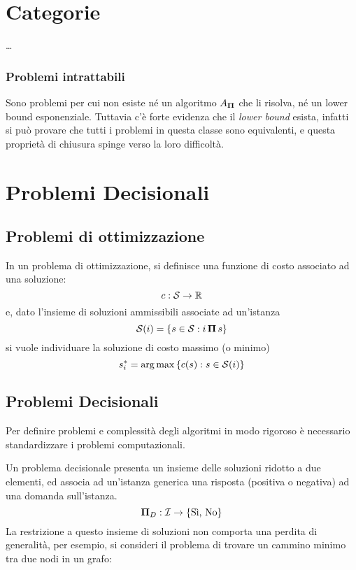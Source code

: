 

\section{Categorie}

\dots

\subsubsection{Problemi intrattabili}

Sono problemi per cui non esiste né un algoritmo $A_{\bm{\Pi}{}}$ che li risolva, né un lower bound esponenziale.
Tuttavia c'è forte evidenza che il \textit{lower bound} esista, infatti si può provare che tutti i problemi in questa classe sono equivalenti, e questa proprietà di chiusura spinge verso la loro difficoltà.

\section{Problemi Decisionali}

\subsection{Problemi di ottimizzazione}

In un problema di ottimizzazione, si definisce una funzione di costo associato ad una soluzione:
\begin{equation*}
    c : \mathcal{S}{} \rightarrow \mathbb{R}
\end{equation*}
e, dato l'insieme di soluzioni ammissibili associate ad un'istanza
\begin{equation*}
    \mathcal{S}{} (i) = \left\{ s \in \mathcal{S}{} : i \, \bm{\Pi}{} \, s \right\}
\end{equation*}
si vuole individuare la soluzione di costo massimo (o minimo)
\begin{equation*}
    s_{i}^{*} = \operatorname*{arg\,max} \left\{ c(s) : s \in \mathcal{S}{} (i) \right\}
\end{equation*}

\subsection{Problemi Decisionali}

Per definire problemi e complessità degli algoritmi in modo rigoroso è necessario standardizzare i problemi computazionali.

Un problema decisionale presenta un insieme delle soluzioni ridotto a due elementi, ed associa ad un'istanza generica una risposta (positiva o negativa) ad una domanda sull'istanza.
\begin{equation*}
    \bm{\Pi}{}_{D} : \mathcal{I}{} \rightarrow \left\{ \text{Sì, No} \right\}
\end{equation*}
La restrizione a questo insieme di soluzioni non comporta una perdita di generalità, per esempio, si consideri il problema di trovare un cammino minimo tra due nodi in un grafo:


